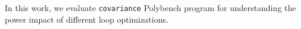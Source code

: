 In this work, we evaluate \texttt{covariance} Polybench program for understanding the power impact of 
different loop optimizations.
